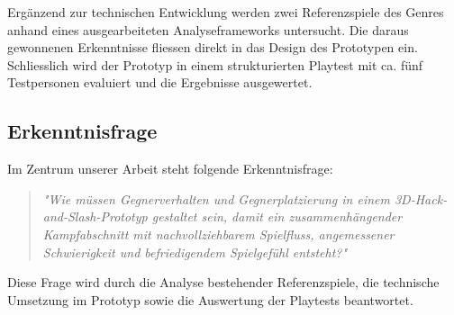 \documentclass[../Main.tex]{subfiles}
\begin{document}
Ergänzend zur technischen Entwicklung werden zwei Referenzspiele des Genres anhand eines ausgearbeiteten Analyseframeworks untersucht. Die daraus gewonnenen Erkenntnisse fliessen direkt in das Design des Prototypen ein. Schliesslich wird der Prototyp in einem strukturierten Playtest mit ca. fünf Testpersonen evaluiert und die Ergebnisse ausgewertet.


\subsection{Erkenntnisfrage}

Im Zentrum unserer Arbeit steht folgende Erkenntnisfrage:

\begin{quote}
\textit{"Wie müssen Gegnerverhalten und Gegnerplatzierung in einem 3D-Hack-and-Slash-Prototyp gestaltet sein, damit ein zusammenhängender Kampfabschnitt mit nachvollziehbarem Spielfluss, angemessener Schwierigkeit und befriedigendem Spielgefühl entsteht?"}
\end{quote}

Diese Frage wird durch die Analyse bestehender Referenzspiele, die technische Umsetzung im Prototyp sowie die Auswertung der Playtests beantwortet.
\end{document}
